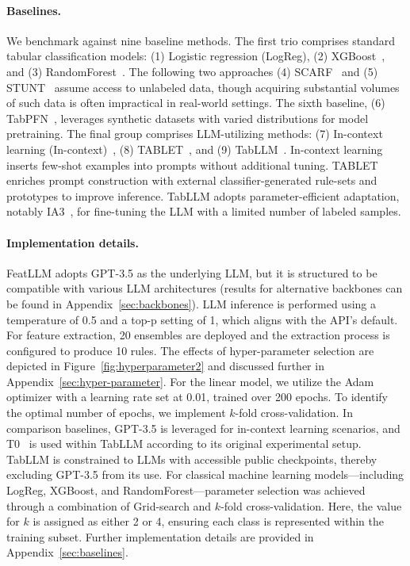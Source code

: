 \paragraph{Baselines.}
We benchmark against nine baseline methods. The first trio comprises standard tabular classification models: (1) Logistic regression (LogReg), (2) XGBoost~\cite{chen2016xgboost}, and (3) RandomForest~\cite{ho1995random}. The following two approaches (4) SCARF~\cite{bahri2022scarf} and (5) STUNT~\cite{nam2023stunt} assume access to unlabeled data, though acquiring substantial volumes of such data is often impractical in real-world settings. The sixth baseline, (6) TabPFN~\cite{hollmann2022tabpfn}, leverages synthetic datasets with varied distributions for model pretraining. The final group comprises LLM-utilizing methods: (7) In-context learning (In-context)~\cite{wei2022emergent}, (8) TABLET~\cite{slack2023tablet}, and (9) TabLLM~\cite{hegselmann2023tabllm}. In-context learning inserts few-shot examples into prompts without additional tuning. TABLET enriches prompt construction with external classifier-generated rule-sets and prototypes to improve inference. TabLLM adopts parameter-efficient adaptation, notably IA3~\cite{liu2022few}, for fine-tuning the LLM with a limited number of labeled samples.

\vspace*{-0.12in}
\paragraph{Implementation details.}
\textsf{FeatLLM} adopts GPT-3.5 as the underlying LLM, but it is structured to be compatible with various LLM architectures (results for alternative backbones can be found in Appendix~\ref{sec:backbones}). LLM inference is performed using a temperature of 0.5 and a top-p setting of 1, which aligns with the API's default. For feature extraction, 20 ensembles are deployed and the extraction process is configured to produce 10 rules. The effects of hyper-parameter selection are depicted in Figure~\ref{fig:hyperparameter2} and discussed further in Appendix~\ref{sec:hyper-parameter}. For the linear model, we utilize the Adam optimizer with a learning rate set at 0.01, trained over 200 epochs. To identify the optimal number of epochs, we implement $k$-fold cross-validation. In comparison baselines, GPT-3.5 is leveraged for in-context learning scenarios, and T0~\cite{sanh2022multitask} is used within TabLLM according to its original experimental setup. TabLLM is constrained to LLMs with accessible public checkpoints, thereby excluding GPT-3.5 from its use. For classical machine learning models—including LogReg, XGBoost, and RandomForest—parameter selection was achieved through a combination of Grid-search and $k$-fold cross-validation. Here, the value for $k$ is assigned as either 2 or 4, ensuring each class is represented within the training subset. Further implementation details are provided in Appendix~\ref{sec:baselines}.

